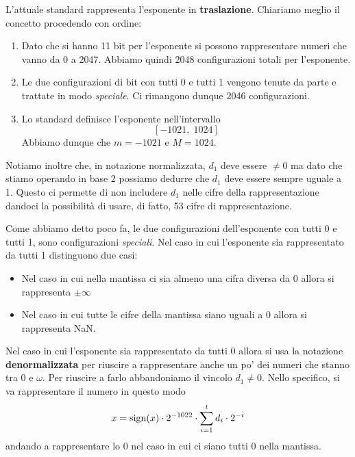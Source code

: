 L'attuale standard rappresenta l'esponente in \textbf{traslazione}. Chiariamo meglio
il concetto procedendo con ordine:
\begin{enumerate}
	\item Dato che si hanno 11 bit per l'esponente si possono rappresentare numeri che vanno da 0 a 2047. Abbiamo
	      quindi 2048 configurazioni totali per l'esponente.
	\item Le due configurazioni di bit con tutti 0 e tutti 1 vengono tenute da parte e trattate in modo
	      \emph{speciale}. Ci rimangono dunque 2046 configurazioni.
	\item Lo standard definisce l'esponente nell'intervallo
	      \[ [ -1021, \; 1024 ] \]
	      Abbiamo dunque che $m = -1021$ e $M = 1024$.
\end{enumerate}
Notiamo inoltre che, in notazione normalizzata, $d_1$ deve essere $\neq 0$ ma dato che stiamo operando in
base 2 possiamo dedurre che $d_1$ deve essere sempre uguale a 1. Questo ci permette di non includere $d_1$
nelle cifre della rappresentazione dandoci la possibilità di usare, di fatto, 53 cifre di rappresentazione.

Come abbiamo detto poco fa, le due configurazioni dell'esponente con tutti 0 e tutti 1, sono configurazioni
\emph{speciali}. Nel caso in cui l'esponente sia rappresentato da tutti 1 distinguono due casi:
\begin{itemize}
	\item Nel caso in cui nella mantissa ci sia almeno una cifra diversa da 0 allora si rappresenta
	      $\pm \infty$
	\item Nel caso in cui tutte le cifre della mantissa siano uguali a 0 allora si rappresenta NaN.
\end{itemize}
Nel caso in cui l'esponente sia rappresentato da tutti 0 allora si usa la notazione \textbf{denormalizzata}
per riuscire a rappresentare anche un po' dei numeri che stanno tra 0 e $\omega$. Per riuscire a farlo
abbandoniamo il vincolo $d_1 \neq 0$. Nello specifico, si va rappresentare il numero in questo modo
\[ x = \operatorname{sign}(x) \cdot 2^{-1022} \cdot \sum_{i=1}^t d_i \cdot 2^{-i} \]
andando a rappresentare lo 0 nel caso in cui ci siano tutti 0 nella mantissa.
